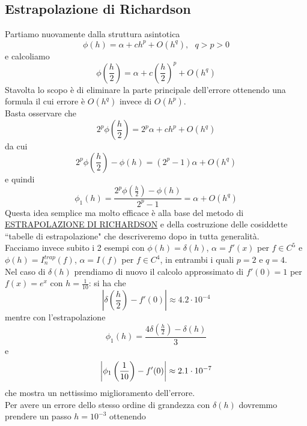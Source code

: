 \documentclass[12pt,a4paper]{article}
\DeclarePairedDelimiter{\abs}{\lvert}{\rvert}
\begin{document}
\subsection{Estrapolazione di Richardson}
Partiamo nuovamente dalla struttura asintotica
\begin{equation*}
    \phi(h)=\alpha+ch^p+O(h^q),\  \  \ q>p>0
\end{equation*}
e calcoliamo 
\begin{equation*}
    \phi(\frac{h}{2})=\alpha+c(\frac{h}{2})^p+O(h^q)
\end{equation*}
Stavolta lo scopo è di eliminare la parte principale dell'errore
ottenendo una formula il cui errore è $O(h^q)$ invece di $O(h^p)$.\\Basta osservare che
\begin{equation*}
    2^p\phi(\frac{h}{2})=2^p\alpha+ch^p+O(h^q)
\end{equation*}
da cui
\begin{equation*}
    2^p\phi(\frac{h}{2})-\phi(h)=(2^p-1)\alpha+O(h^q)
\end{equation*}
e quindi
\begin{equation*}
    \phi_1(h)=\frac{2^p\phi(\frac{h}{2})-\phi(h)}{2^p-1}=\alpha+O(h^q)
\end{equation*}
Questa idea semplice ma molto efficace è alla base del metodo di \uline{ESTRAPOLAZIONE DI RICHARDSON} e della costruzione delle cosiddette
``tabelle di estrapolazione" che descriveremo dopo in tutta generalità.\\Facciamo invece subito i 2 esempi con $\phi(h)=\delta(h)$, $\alpha=f'(x)$ per $f\in C^5$ e $\phi(h)=I_n^{trap}(f)$, $\alpha=I(f)$ per $f\in C^4$, in entrambi i quali $p=2$ e $q=4$.\\Nel caso di $\delta(h)$ prendiamo di nuovo il calcolo approssimato di $f'(0)=1$ per $f(x)=e^x$ con $h=\frac{1}{10}$: si ha che 
\begin{equation*}
    |\delta(\frac{h}{2})-f'(0)|\approx4.2\cdot 10^{-4}
\end{equation*}
mentre con l'estrapolazione
\[\phi_1(h) = \frac{4\delta \left( \frac{h}{2} \right) - \delta(h)}{3}\] e
\[ \abs*{\phi_1 \left(\frac{1}{10}\right) - f'(0)} \approx 2.1 \cdot 10^{-7}\]
che mostra un nettissimo miglioramento dell'errore. \\
Per avere un errore dello stesso ordine di grandezza con $\delta(h)$ dovremmo prendere un passo $h = 10^{-3}$ ottenendo
\end{document}
